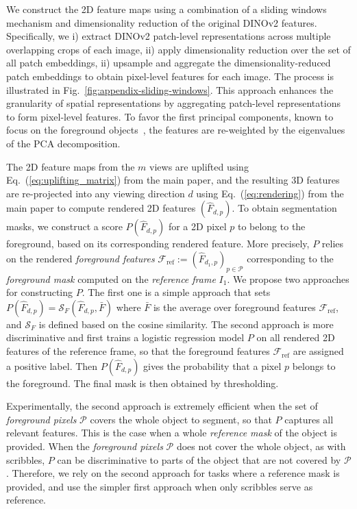 \label{sec:slidingwindows}
We construct the 2D feature maps using a combination of a sliding windows mechanism and dimensionality reduction of the original DINOv2 features. 
Specifically, we i) extract DINOv2 patch-level representations across multiple overlapping crops of each image, ii) apply dimensionality reduction over the set of all patch embeddings, ii) upsample and aggregate the dimensionality-reduced patch embeddings to obtain pixel-level features for each image. The process is illustrated in Fig.~\ref{fig:appendix-sliding-windows}. 
This approach enhances the granularity of spatial representations by aggregating patch-level representations to form pixel-level features. To favor the first principal components, known to focus on the foreground objects~\citep{oquab2024dinov2}, the features are re-weighted by the eigenvalues of the PCA decomposition.

The 2D feature maps from the $m$ views are uplifted using Eq.~(\ref{eq:uplifting_matrix}) from the main paper, and the resulting 3D features are re-projected into any viewing direction $d$ using Eq.~(\ref{eq:rendering}) from the main paper to compute rendered 2D features $(\hat{F}_{d,p})$.
To obtain segmentation masks, we construct a score $P(\hat{F}_{d,p})$ for a 2D pixel $p$ to belong to the foreground, based on its corresponding rendered feature. More precisely, $P$ relies on the rendered \textit{foreground features} $\mathcal{F}_{\text{ref}} := (\hat{F}_{d_1,p})_{p\in \mathcal{P}}$  corresponding to the \textit{foreground mask} computed on the \textit{reference frame} $I_1$. 
We propose two approaches for constructing $P$. 
The first one is a simple approach that sets $P(\hat{F}_{d,p}) = \mathcal{S}_F(\hat{F}_{d,p}, \bar{F})$ where $\bar{F}$ is the average over foreground features $\mathcal{F}_{\text{ref}}$, and $\mathcal{S}_F$ is defined based on the cosine similarity. 
The second approach is more discriminative and first trains a logistic regression model $P$ on all rendered 2D features of the reference frame, so that the foreground features $\mathcal{F}_{\text{ref}}$  are assigned a positive label. Then $P(\hat{F}_{d,p})$ gives the probability that a pixel $p$ belongs to the foreground. The final mask is then obtained by thresholding.

Experimentally, the second approach is extremely efficient when the set of \textit{foreground pixels}  $\mathcal{P}$ covers the whole object to segment, so that $P$ captures all relevant features. This is the case when a whole \textit{reference mask} of the object is provided. When the \textit{foreground pixels}  $\mathcal{P}$ does not cover the whole object, as with scribbles, $P$ can be discriminative to parts of the object that are not covered by $\mathcal{P}$. Therefore, we rely on the second approach for tasks where a reference mask is provided, and use the simpler first approach when only scribbles serve as reference. 

